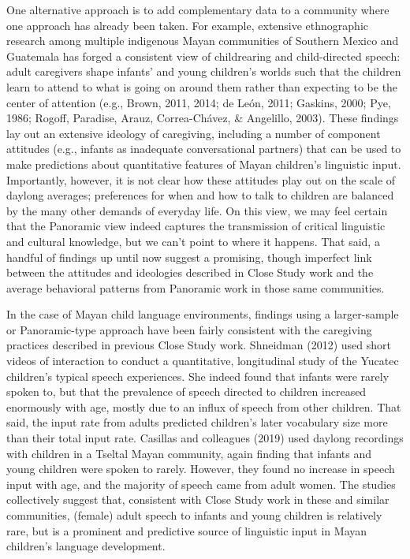 \documentclass[,man,floatsintext]{apa6}
\begin{document}
One alternative approach is to add complementary data to a community
where one approach has already been taken. For example, extensive
ethnographic research among multiple indigenous Mayan communities of
Southern Mexico and Guatemala has forged a consistent view of
childrearing and child-directed speech: adult caregivers shape infants'
and young children's worlds such that the children learn to attend to
what is going on around them rather than expecting to be the center of
attention (e.g., Brown, 2011, 2014; de León, 2011; Gaskins, 2000; Pye,
1986; Rogoff, Paradise, Arauz, Correa-Chávez, \& Angelillo, 2003). These
findings lay out an extensive ideology of caregiving, including a number
of component attitudes (e.g., infants as inadequate conversational
partners) that can be used to make predictions about quantitative
features of Mayan children's linguistic input. Importantly, however, it
is not clear how these attitudes play out on the scale of daylong
averages; preferences for when and how to talk to children are balanced
by the many other demands of everyday life. On this view, we may feel
certain that the Panoramic view indeed captures the transmission of
critical linguistic and cultural knowledge, but we can't point to where
it happens. That said, a handful of findings up until now suggest a
promising, though imperfect link between the attitudes and ideologies
described in Close Study work and the average behavioral patterns from
Panoramic work in those same communities.

In the case of Mayan child language environments, findings using a
larger-sample or Panoramic-type approach have been fairly consistent
with the caregiving practices described in previous Close Study work.
Shneidman (2012) used short videos of interaction to conduct a
quantitative, longitudinal study of the Yucatec children's typical
speech experiences. She indeed found that infants were rarely spoken to,
but that the prevalence of speech directed to children increased
enormously with age, mostly due to an influx of speech from other
children. That said, the input rate from adults predicted children's
later vocabulary size more than their total input rate. Casillas and
colleagues (2019) used daylong recordings with children in a Tseltal
Mayan community, again finding that infants and young children were
spoken to rarely. However, they found no increase in speech input with
age, and the majority of speech came from adult women. The studies
collectively suggest that, consistent with Close Study work in these and
similar communities, (female) adult speech to infants and young children
is relatively rare, but is a prominent and predictive source of
linguistic input in Mayan children's language development.
\end{document}
